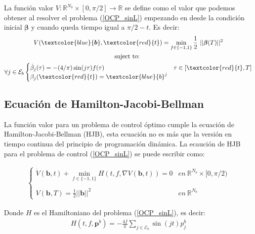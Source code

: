 \begin{defi} 
    La función valor $V:\mathbb{R}^{N_b} \times [0,\pi/2] \rightarrow \mathbb{R}$ se define como el valor que podemos obtener al resolver el problema (\ref{OCP_sinL}) empezando en desde la condición inicial $\bm{\beta}$ y cuando queda tiempo igual a $\pi/2-t$. Es decir:   
    \begin{gather}
        V(\textcolor{blue}{\bm{b}},\textcolor{red}{t}) = \min_{f \in \{-1,1\}} \frac{1}{2} ||\bm{\beta}(T)||^2 \\
        \notag \text{suject to: } \\
        \notag \forall j \in \mathcal{E}_b
        \begin{cases}
            \dot{\beta}_j(\tau) =  - (4/\pi) \sin(j\tau) f(\tau) & \tau \in [\textcolor{red}{t},T]\label{dyn}\\
            \beta_j(\textcolor{red}{t}) = \textcolor{blue}{b}^j
        \end{cases}      
     \end{gather} 
\end{defi}


\subsection{Ecuación de Hamilton-Jacobi-Bellman}

La función valor para un problema de control óptimo cumple la ecuación de Hamilton-Jacobi-Bellman (HJB), esta ecuación no es más que la versión en tiempo continua del principio de programación dinámica. La ecaución de HJB para el problema de control (\ref{OCP_sinL}) se puede escribir como:

\begin{gather}\label{Hmin}
    \begin{cases}
        \displaystyle \dot{V}(\bm{b},t) + \min_{f \in \{ -1,1\}} H(t,f,\nabla V(\bm{b},t)) = 0 & en \ \mathbb{R}^{N_b} \times [0,\pi/2)\\ \\ 
        V(\bm{b},T) = \frac{1}{2} ||\bm{b}||^2 & en \ \mathbb{R}^{N_b}
    \end{cases}
\end{gather}

Donde $H$ es el Hamiltoniano del problema (\ref{OCP_sinL}), es decir:
\begin{gather}
    H(t,f,\bm{p}^b) = -\frac{4f}{\pi}\sum_{j \in \mathcal{E}_b} \sin(jt) p^b_j 
\end{gather}

